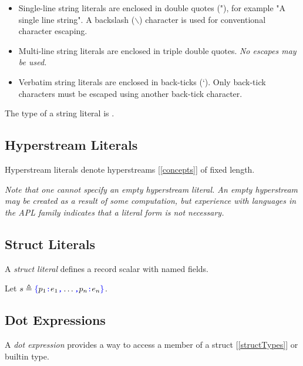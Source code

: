 \documentclass{article}
\begin{document}
\StringLiteral{}

\begin{itemize}
\item
Single-line string literals are enclosed in double quotes (\textsf{"}), for example \textsf{"}A single line string\textsf{"}. A backslash ($\backslash$) character is used for conventional character escaping.
\item Multi-line string literals are enclosed in triple double quotes.  {\em No escapes may be used.}
\item Verbatim string literals are enclosed in back-ticks (`). Only back-tick characters must be escaped using another back-tick character.
\end{itemize}

The type of a string literal is \STRING.

\subsection{Hyperstream Literals}
\label{hyperstreamLiterals}

\HyperstreamLiteral

Hyperstream literals denote hyperstreams [\ref{concepts}] of fixed length. 

{\em Note that one cannot specify an empty hyperstream literal. An empty hyperstream may be created as a result of some computation, but experience with languages in the APL family indicates that a literal form is not necessary.}


\subsection{Struct Literals}
\label{structLiterals}

A {\em struct literal} defines a record scalar with named fields.

\StructLiteral{}
\Property{}

Let $s \triangleq \texttt{\color{blue} $\{$}{}p_1\texttt{\color{blue} :}{} e_1\texttt{\color{blue} ,}{} \ldots \texttt{\color{blue} ,}{} p_n\texttt{\color{blue} :}{} e_n\texttt{\color{blue} $\}$}$.


\subsection{Dot Expressions}
\label{dotExpressions}

A {\em dot expression} provides a way to access a member of a struct [\ref{structTypes}] or builtin type.

\DotExpression{}
\end{document}
